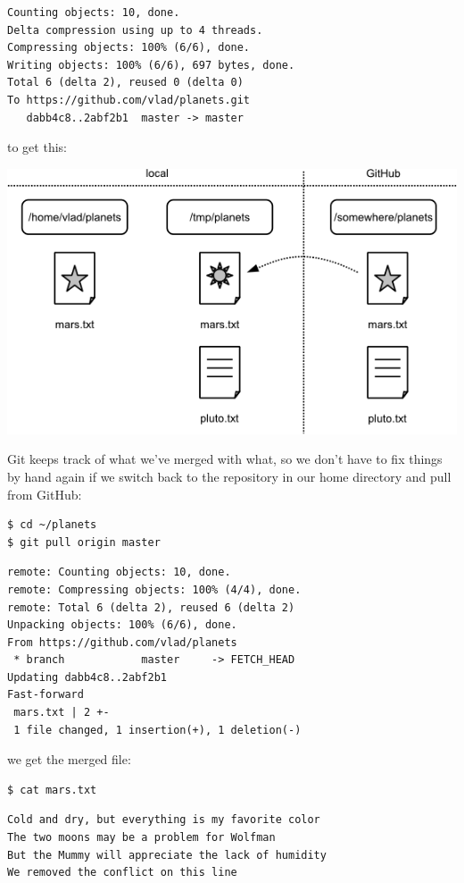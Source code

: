 \documentclass{book}
\begin{document}
\begin{verbatim}
Counting objects: 10, done.
Delta compression using up to 4 threads.
Compressing objects: 100% (6/6), done.
Writing objects: 100% (6/6), 697 bytes, done.
Total 6 (delta 2), reused 0 (delta 0)
To https://github.com/vlad/planets.git
   dabb4c8..2abf2b1  master -> master
\end{verbatim}

to get this:

\includegraphics{novice/git/img/git-after-merging.png}

Git keeps track of what we've merged with what, so we don't have to fix
things by hand again if we switch back to the repository in our home
directory and pull from GitHub:

\begin{verbatim}
$ cd ~/planets
$ git pull origin master
\end{verbatim}

\begin{verbatim}
remote: Counting objects: 10, done.
remote: Compressing objects: 100% (4/4), done.
remote: Total 6 (delta 2), reused 6 (delta 2)
Unpacking objects: 100% (6/6), done.
From https://github.com/vlad/planets
 * branch            master     -> FETCH_HEAD
Updating dabb4c8..2abf2b1
Fast-forward
 mars.txt | 2 +-
 1 file changed, 1 insertion(+), 1 deletion(-)
\end{verbatim}

we get the merged file:

\begin{verbatim}
$ cat mars.txt
\end{verbatim}

\begin{verbatim}
Cold and dry, but everything is my favorite color
The two moons may be a problem for Wolfman
But the Mummy will appreciate the lack of humidity
We removed the conflict on this line
\end{verbatim}
\end{document}
